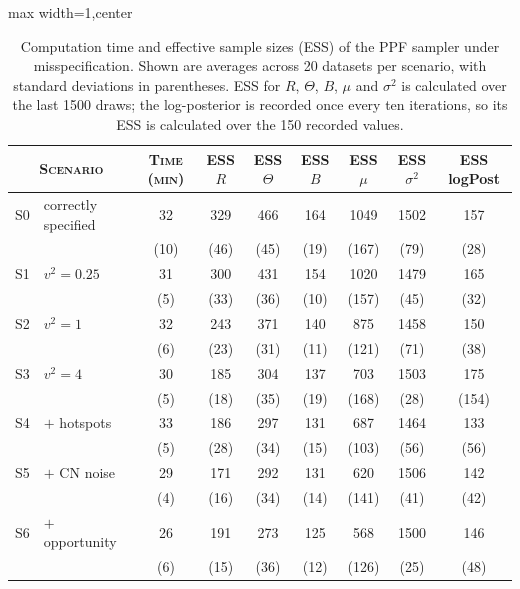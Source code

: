 \begin{table}[th]
\caption{Computation time and effective sample sizes (ESS) of the PPF sampler under misspecification. Shown are averages across 20 datasets per scenario, with standard deviations in parentheses. ESS for $R$, $\Theta$, $B$, $\mu$ and $\sigma^2$ is calculated over the last 1500 draws; the log-posterior is recorded once every ten iterations, so its ESS is calculated over the 150 recorded values.}
\centering
\small
\begin{adjustbox}{max width=1\textwidth,center}
\begin{tabular}{|cl|c|cccccc|}
\hline
\multicolumn{2}{|c|}{\textsc{Scenario}} & \textsc{Time (min)} & \textsc{ESS} $R$ & \textsc{ESS} $\Theta$ & \textsc{ESS} $B$ & \textsc{ESS} $\mu$ & \textsc{ESS} $\sigma^2$ & \textsc{ESS} logPost \\
\hline
S0 & correctly specified & 32 & 329 & 466 & 164 & 1049 & 1502 & 157 \\
 & & {\scriptsize (10)} & {\scriptsize (46)} & {\scriptsize (45)} & {\scriptsize (19)} & {\scriptsize (167)} & {\scriptsize (79)} & {\scriptsize (28)} \\
\hline
S1 & $v^2 = 0.25$ & 31 & 300 & 431 & 154 & 1020 & 1479 & 165 \\
 & & {\scriptsize (5)} & {\scriptsize (33)} & {\scriptsize (36)} & {\scriptsize (10)} & {\scriptsize (157)} & {\scriptsize (45)} & {\scriptsize (32)} \\
\hline
S2 & $v^2 = 1$ & 32 & 243 & 371 & 140 & 875 & 1458 & 150 \\
 & & {\scriptsize (6)} & {\scriptsize (23)} & {\scriptsize (31)} & {\scriptsize (11)} & {\scriptsize (121)} & {\scriptsize (71)} & {\scriptsize (38)} \\
\hline
S3 & $v^2 = 4$ & 30 & 185 & 304 & 137 & 703 & 1503 & 175 \\
 & & {\scriptsize (5)} & {\scriptsize (18)} & {\scriptsize (35)} & {\scriptsize (19)} & {\scriptsize (168)} & {\scriptsize (28)} & {\scriptsize (154)} \\
\hline
S4 & $+$ hotspots & 33 & 186 & 297 & 131 & 687 & 1464 & 133 \\
 & & {\scriptsize (5)} & {\scriptsize (28)} & {\scriptsize (34)} & {\scriptsize (15)} & {\scriptsize (103)} & {\scriptsize (56)} & {\scriptsize (56)} \\
\hline
S5 & $+$ CN noise & 29 & 171 & 292 & 131 & 620 & 1506 & 142 \\
 & & {\scriptsize (4)} & {\scriptsize (16)} & {\scriptsize (34)} & {\scriptsize (14)} & {\scriptsize (141)} & {\scriptsize (41)} & {\scriptsize (42)} \\
\hline
S6 & $+$ opportunity & 26 & 191 & 273 & 125 & 568 & 1500 & 146 \\
 & & {\scriptsize (6)} & {\scriptsize (15)} & {\scriptsize (36)} & {\scriptsize (12)} & {\scriptsize (126)} & {\scriptsize (25)} & {\scriptsize (48)} \\
\hline
\end{tabular}
\end{adjustbox}
\label{tab:mcmc_misspec}
\end{table}
